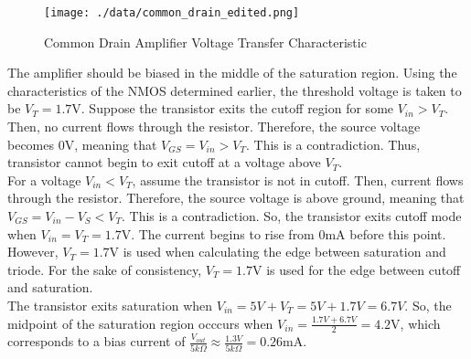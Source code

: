 \FloatBarrier

\begin{figure}[h!]
	\centering
	\texttt{[image: ./data/common\_drain\_edited.png]}
	\caption{Common Drain Amplifier Voltage Transfer Characteristic}
	\label{fig:common_drain}
\end{figure}

\FloatBarrier

The amplifier should be biased in the middle of the saturation region. Using the characteristics of the NMOS determined earlier, the threshold voltage is taken to be $V_T = 1.7$\si{\volt}. Suppose the transistor exits the cutoff region for some $V_{in} > V_T$. Then, no current flows through the resistor. Therefore, the source voltage becomes $0$\si{\volt}, meaning that $V_{GS} = V_{in} > V_T$. This is a contradiction. Thus, transistor cannot begin to exit cutoff at a voltage above $V_T$. \\

For a voltage $V_{in} < V_T$, assume the transistor is not in cutoff. Then, current flows through the resistor.
Therefore, the source voltage is above ground, meaning that $V_{GS} = V_{in} - V_S < V_T$.
This is a contradiction.
So, the transistor exits cutoff mode when $V_{in} = V_T = 1.7$\si{\volt}. The current begins to rise from $0$\si{\milli\ampere} before this point.
However, $V_T = 1.7$\si{\volt} is used when calculating the edge between saturation and triode. For the sake of consistency, $V_T = 1.7$\si{\volt} is used for the edge between cutoff and saturation. \\

The transistor exits saturation when $V_{in} = 5V + V_T = 5V + 1.7V = 6.7V$. 
So, the midpoint of the saturation region occcurs when $V_{in} = \frac{1.7V + 6.7V}{2} = 4.2$\si{\volt}, which corresponds to a bias current of $\frac{V_{out}}{5k\Omega} \approx \frac{1.3V}{5k\Omega} = 0.26$\si{\milli\ampere}.
